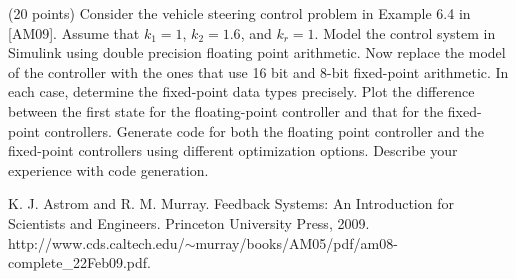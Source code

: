 \documentclass[a4paper, 12pt]{article}
\begin{document}
\newpage
\begin{problem}{}
(20 points) Consider the vehicle steering control problem in Example 6.4 in [AM09]. Assume that $k_1 = 1$, $k_2 = 1.6$, and $k_r = 1$. Model the control system in Simulink using double precision floating point arithmetic. Now replace the model of the controller with the ones that use 16 bit and 8-bit fixed-point arithmetic. In each case, determine the fixed-point data types precisely. Plot the difference between the first state for the floating-point controller and that for the fixed-point controllers. Generate code for both the floating point controller and the fixed-point controllers using different optimization options. Describe your experience with code generation.

\noindent
[AM09] K. J. Astrom and R. M. Murray. Feedback Systems: An Introduction for Scientists and Engineers. Princeton University Press, 2009. \\
http://www.cds.caltech.edu/$\sim$murray/books/AM05/pdf/am08-complete\_22Feb09.pdf. \\
\\
\begin{minipage}{1\textwidth}
		\rectangle{\linewidth}{20cm}
\end{minipage}
\newpage
\ \\
\begin{minipage}{1\textwidth}
		\rectangle{\linewidth}{24cm}
\end{minipage}
\newpage
\ \\
\begin{minipage}{1\textwidth}
		\rectangle{\linewidth}{24cm}
\end{minipage}
\newpage
\ \\
\begin{minipage}{1\textwidth}
		\rectangle{\linewidth}{24cm}
\end{minipage}
\end{problem}
\end{document}
